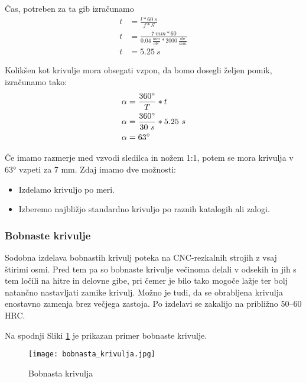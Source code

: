 Čas, potreben za ta gib izračunamo
\begin{equation}
	\label{cas_za_hod}
	\begin{split}
		t &= \frac{l*60\ s}{f*S} \\
		t &= \frac{7\ mm*60}{0.04\ \frac{mm}{obr}*2000\ \frac{obr}{min}} \\
		t &= 5.25\ s
	\end{split}
\end{equation}

Kolikšen kot krivulje mora obsegati vzpon, da bomo
dosegli željen pomik, izračunamo tako:
\begin{equation}
	\label{kot_krivulje}
	\begin{split}
		\alpha &= \frac{360\degree}{T} * t \\
		\alpha &= \frac{360\degree}{30\ s} * 5.25\ s \\
		\alpha &= 63\degree
	\end{split}
\end{equation}

Če imamo razmerje med vzvodi sledilca in nožem 1:1, potem se mora krivulja v 63° vzpeti za 7 mm.
Zdaj imamo dve možnosti:
\begin{itemize}
	\item Izdelamo krivuljo po meri.
	\item Izberemo najbližjo standardno krivuljo po raznih katalogih ali zalogi.
\end{itemize}

\subsubsection{Bobnaste krivulje}
Sodobna izdelava bobnastih krivulj poteka na CNC-rezkalnih strojih
z vsaj štirimi osmi. Pred tem pa so bobnaste krivulje večinoma delali v
odsekih in jih s tem ločili na hitre in delovne gibe, pri čemer je bilo tako
mogoče lažje ter bolj natančno nastavljati zamike krivulj.
Možno je tudi, da se obrabljena krivulja enostavno zamenja brez
večjega zastoja. Po izdelavi se zakalijo na približno 50--60 HRC.

Na spodnji Sliki \ref{bobnaste_krivulje} je prikazan primer
bobnaste krivulje.

\begin{figure}[H]
	\begin{center}
		\texttt{[image: bobnasta\_krivulja.jpg]}
		\caption{Bobnasta krivulja
			\cite{lasten}}
		\label{bobnaste_krivulje}
	\end{center}
\end{figure}

